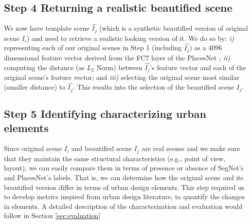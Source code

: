 \subsection*{Step 4 Returning a realistic beautified scene}
 We now have template scene $\hat{I_j}$ (which is a synthetic beautified version of original scene $I_i$) and need to retrieve a realistic looking version of it. We do so by: \emph{i)} representing each of our original scenes in Step 1 (including $\hat{I_j}$) as a 4096 dimensional feature vector derived from the FC7 layer of the PlacesNet \cite{zhou2014learning}; \emph{ii)} computing the distance (as $L_2$ Norm) between $\hat{I_j}$'s feature vector and each of the original scene's feature vector; and \emph{iii)} selecting the original scene most similar (smaller distance) to $\hat{I_j}$. This results into the selection of the beautified scene $I_j$.
 
 
\subsection*{Step 5 Identifying  characterizing urban elements}
Since original scene $I_i$ and beautified scene $I_j$ are real scenes and we make sure that they maintain the same structural characteristics (e.g., point of view, layout), we can easily compare them in terms of presence or absence of SegNet's and PlacesNet's labels. That is, we can determine how the original scene and its beautified version differ in terms of urban design elements. This step required us to develop metrics inspired from urban design literature, to quantify the changes in elements. A detailed description of the characterization and evaluation would follow in Section \ref{sec:evaluation}
 
 


